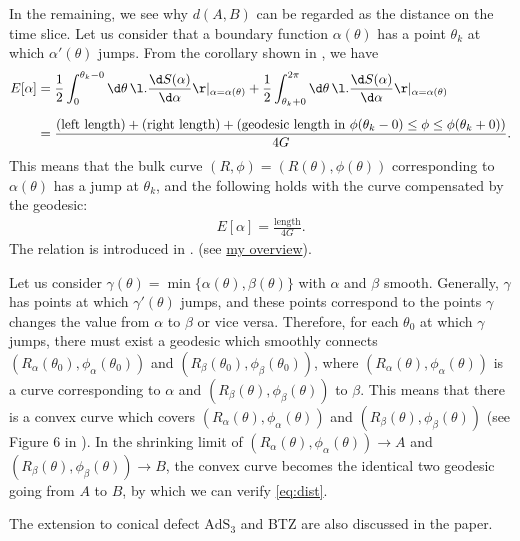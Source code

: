 \documentclass[12pt]{article}
\begin{document}
In the remaining, we see why $d(A,B)$ can be regarded as the distance on the time slice.
Let us consider that a boundary function $\alpha(\theta)$ has a point $\theta_k$ at which $\alpha'(\theta)$ jumps.
From the corollary shown in \cite{Balasubramanian:2013lsa}, we have
\begin{align}
	E[\alpha] &= \frac{1}{2}\int_{0}^{\theta_k-0}\d\theta\,\l.\frac{\d S(\alpha)}{\d \alpha}\r|_{\alpha = \alpha(\theta)} + \frac{1}{2}\int_{\theta_k+0}^{2\pi}\d\theta\,\l.\frac{\d S(\alpha)}{\d \alpha}\r|_{\alpha = \alpha(\theta)}\nonumber\\[2mm]
	&= \frac{(\mbox{left length}) + (\mbox{right length}) + (\mbox{geodesic length in } \phi(\theta_k-0)\leq \phi\leq \phi(\theta_k+0))}{4G}.
\end{align}
This means that the bulk curve $(R,\phi) = (R(\theta),\phi(\theta))$ corresponding to $\alpha(\theta)$ has a jump at $\theta_k$,
and the following holds with the curve compensated by the geodesic:
\begin{align}
	E[\alpha] = \frac{\mbox{length}}{4G}.
\end{align}
The relation is introduced in \cite{Balasubramanian:2013lsa}.
(see \href{https://albertmcc.github.io/web/reviews/Hole_ographic_spacetime.pdf}{\color{blue}my overview}).

Let us consider $\gamma(\theta) = \min\{\alpha(\theta),\beta(\theta)\}$ with $\alpha$ and $\beta$ smooth.
Generally, $\gamma$ has points at which $\gamma'(\theta)$ jumps, and these points correspond to the points $\gamma$
 changes the value from $\alpha$ to $\beta$ or vice versa.
Therefore, for each $\theta_0$ at which $\gamma$ jumps, there must exist a geodesic which smoothly connects 
$(R_\alpha(\theta_0),\phi_\alpha(\theta_0))$ and $(R_\beta(\theta_0),\phi_\beta(\theta_0))$, where 
$(R_\alpha(\theta),\phi_\alpha(\theta))$ is a curve corresponding to $\alpha$ and $(R_\beta(\theta),\phi_\beta(\theta))$ to 
$\beta$.
This means that there is a convex curve which covers $(R_\alpha(\theta),\phi_\alpha(\theta))$ and 
$(R_\beta(\theta),\phi_\beta(\theta))$ (see Figure 6 in \cite{Czech:2014ppa}).
In the shrinking limit of $(R_\alpha(\theta),\phi_\alpha(\theta))\to A$ and $(R_\beta(\theta),\phi_\beta(\theta))\to B$, 
the convex curve becomes the identical two geodesic going from $A$ to $B$, by which we can verify \eqref{eq:dist}.

The extension to conical defect $\mathrm{AdS}_3$ and BTZ are also discussed in the paper.












 

\end{document}
